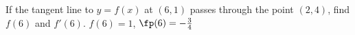 {If the tangent line to $y=f(x)$ at $(6,1)$ passes through the point $(2,4)$, find $f(6)$ and $f'(6)$.}
{$f(6)=1$, $\fp(6)=-\frac34$}
